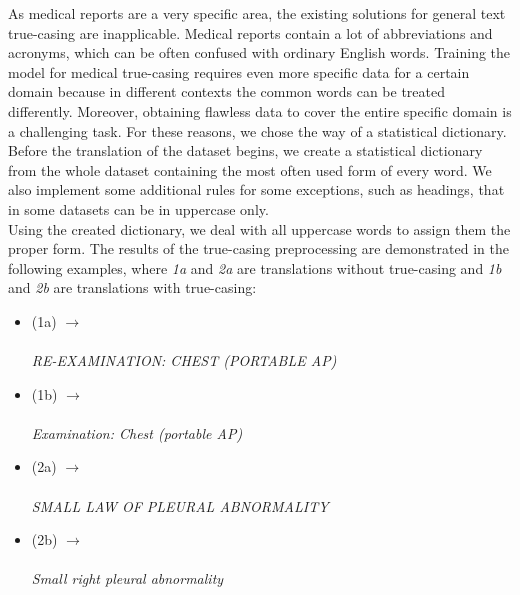 As medical reports are a very specific area, the existing solutions for general text true-casing are inapplicable. Medical reports contain a lot of abbreviations and acronyms, which can be often confused with ordinary English words. Training the model for medical true-casing requires even more specific data for a certain domain because in different contexts the common words can be treated differently. Moreover, obtaining flawless data to cover the entire specific domain is a challenging task. For these reasons, we chose the way of a statistical dictionary. Before the translation of the dataset begins, we create a statistical dictionary from the whole dataset containing the most often used form of every word. We also implement some additional rules for some exceptions, such as headings, that in some datasets can be in uppercase only.\\

Using the created dictionary, we deal with all uppercase words to assign them the proper form. The results of the true-casing preprocessing are demonstrated in the following examples, where \textit{1a} and \textit{2a} are translations without true-casing and \textit{1b} and \textit{2b} are translations with true-casing:
\begin{itemize}
	\item (1a)  $\rightarrow$ \\ \phantom{(1a)}  \\ \phantom{(1a)} \textit{RE-EXAMINATION: CHEST (PORTABLE AP)}
	\item (1b)  $\rightarrow$ \\ \phantom{(1b)}  \\ \phantom{(1b)} \textit{Examination: Chest (portable AP)}
	\item (2a)  $\rightarrow$ \\ \phantom{(2a)}  \\ \phantom{(2a)} \textit{SMALL LAW OF PLEURAL ABNORMALITY}
	\item (2b)  $\rightarrow$ \\ \phantom{(2b)}  \\ \phantom{(2b)} \textit{Small right pleural abnormality}
\end{itemize}

